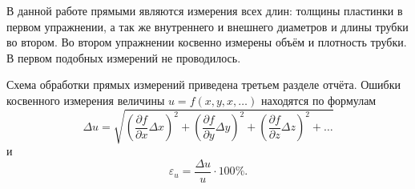 \begin{Enumerate}
	В данной работе прямыми являются измерения всех длин: толщины пластинки в первом упражнении, а так же внутреннего и внешнего диаметров и длины трубки во втором. Во втором упражнении косвенно измерены объём и плотность трубки. В первом подобных измерений не проводилось.
	
	\item Схема обработки прямых измерений приведена третьем разделе отчёта. Ошибки косвенного измерения величины $u=f(x,y,x,\ldots)$ находятся по формулам
	\[
	\Delta u=\sqrt{\left(\frac{\partial f}{\partial x}\Delta x\right)^2+\left(\frac{\partial f}{\partial y}\Delta y\right)^2+\left(\frac{\partial f}{\partial z}\Delta z\right)^2+\ldots}
	\]
	и
	\[
	\varepsilon_u=\frac{\Delta u}{u}\cdot100\%.
	\]
\end{Enumerate}